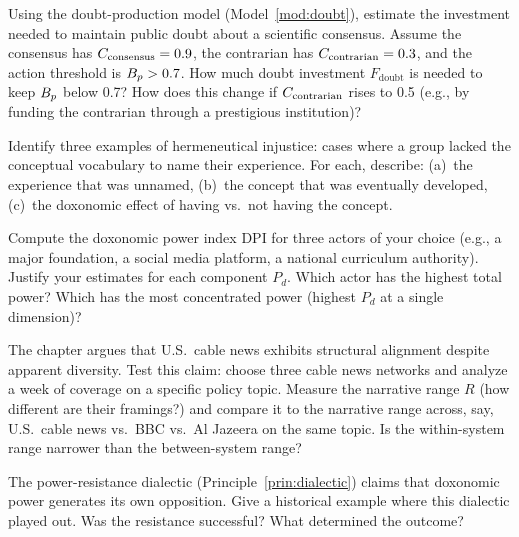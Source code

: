 \begin{exercise}
\label{ex:ch9-doubt}
Using the doubt-production model (Model~\ref{mod:doubt}), estimate the investment needed to maintain public doubt about a scientific consensus.
Assume the consensus has $C_{\text{consensus}} = 0.9$, the contrarian has $C_{\text{contrarian}} = 0.3$, and the action threshold is $B_{p} > 0.7$.
How much doubt investment $F_{\text{doubt}}$ is needed to keep $B_{p}$ below 0.7?
How does this change if $C_{\text{contrarian}}$ rises to 0.5 (e.g., by funding the contrarian through a prestigious institution)?
\end{exercise}

\begin{exercise}
Identify three examples of hermeneutical injustice: cases where a group lacked the conceptual vocabulary to name their experience.
For each, describe: (a)~the experience that was unnamed, (b)~the concept that was eventually developed, (c)~the doxonomic effect of having vs.\ not having the concept.
\end{exercise}

\begin{exercise}
Compute the doxonomic power index $\mathrm{DPI}$ for three actors of your choice (e.g., a major foundation, a social media platform, a national curriculum authority).
Justify your estimates for each component $P_d$.
Which actor has the highest total power?
Which has the most concentrated power (highest $P_d$ at a single dimension)?
\end{exercise}

\begin{exercise}
\label{ex:ch9-structural}
The chapter argues that U.S.\ cable news exhibits structural alignment despite apparent diversity.
Test this claim: choose three cable news networks and analyze a week of coverage on a specific policy topic.
Measure the narrative range $R$ (how different are their framings?) and compare it to the narrative range across, say, U.S.\ cable news vs.\ BBC vs.\ Al Jazeera on the same topic.
Is the within-system range narrower than the between-system range?
\end{exercise}

\begin{exercise}
The power-resistance dialectic (Principle~\ref{prin:dialectic}) claims that doxonomic power generates its own opposition.
Give a historical example where this dialectic played out.
Was the resistance successful?
What determined the outcome?
\end{exercise}
